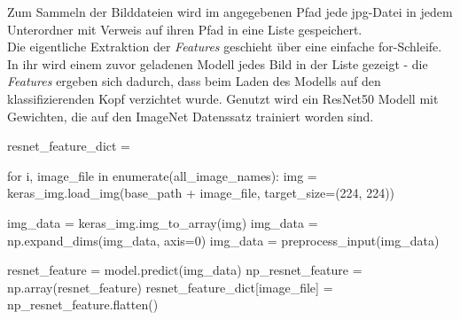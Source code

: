 \documentclass[a4paper,12pt,ngerman]{article}
\begin{document}
Zum Sammeln der Bilddateien wird im angegebenen Pfad jede jpg-Datei in jedem Unterordner mit Verweis auf ihren Pfad in eine Liste gespeichert. \\

Die eigentliche Extraktion der \textit{Features} geschieht über eine einfache for-Schleife. In ihr wird einem zuvor geladenen Modell jedes Bild in der Liste gezeigt - die \textit{Features} ergeben sich dadurch, dass beim Laden des Modells auf den klassifizierenden Kopf verzichtet wurde. Genutzt wird ein ResNet50 Modell mit Gewichten, die auf den ImageNet Datenssatz trainiert worden sind. \\

\begin{python}
	resnet_feature_dict = {}

	for i, image_file in enumerate(all_image_names):
		img = keras_img.load_img(base_path + image_file, target_size=(224, 224))

		img_data = keras_img.img_to_array(img)
		img_data = np.expand_dims(img_data, axis=0)
		img_data = preprocess_input(img_data)

		resnet_feature = model.predict(img_data)
		np_resnet_feature = np.array(resnet_feature)
		resnet_feature_dict[image_file] = np_resnet_feature.flatten()
\end{python}
\end{document}
